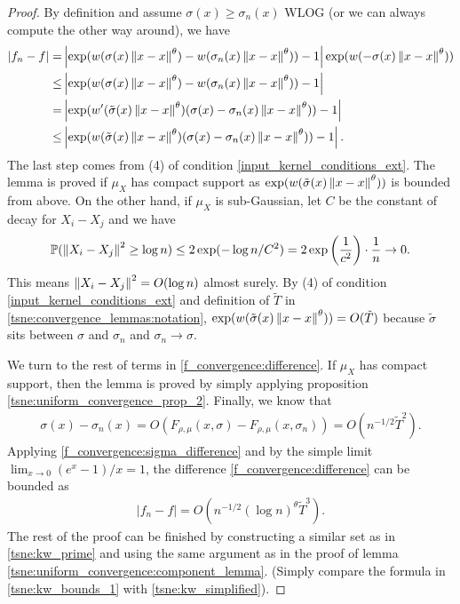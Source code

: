 \begin{proof}
    By definition and assume $\sigma(x) \geq \sigma_n(x)$ WLOG (or we can always compute the other way around), we have
    \begin{align} \label{f_convergence:difference}
        |f_n-f| = & \left|\exp(w(\sigma(x)\left\lVert x-x\right\rVert^{\theta})-w(\sigma_n(x)\left\lVert x-x\right\rVert^{\theta}))-1\right|\exp(w(-\sigma(x)\left\lVert x-x\right\rVert^{\theta})) \nonumber \\
        \leq      & \left|\exp(w(\sigma(x)\left\lVert x-x\right\rVert^{\theta})-w(\sigma_n(x)\left\lVert x-x\right\rVert^{\theta}))-1\right| \nonumber                                       \\
        =         & \left|\exp(w'(\tilde{\sigma}(x)\left\lVert x-x\right\rVert^{\theta})(\sigma(x)-\sigma_n(x)\left\lVert x-x\right\rVert^{\theta}))-1\right| \nonumber                      \\
        \leq      & \left|\exp(w(\tilde{\sigma}(x)\left\lVert x-x\right\rVert^{\theta})(\sigma(x)-\sigma_n(x)\left\lVert x-x\right\rVert^{\theta}))-1\right|.
    \end{align}
    The last step comes from (4) of condition \ref{input_kernel_conditions_ext}. The lemma is proved if $\mu_X$ has compact support as $\exp(w(\tilde{\sigma}(x)\left\lVert x-x\right\rVert^{\theta}))$ is bounded from above. On the other hand, if $\mu_X$ is sub-Gaussian, let $C$ be the constant of decay for $X_i-X_j$ and we have
    \begin{align} \label{tsne:distance_esti}
        \mathbb{P}(\left\lVert X_i-X_j\right\rVert^2 \geq \log n) \leq 2 \exp(-\log n /C^2) = 2 \exp\left(\frac{1}{c^2}\right) \cdot \frac{1}{n} \to 0.
    \end{align}
    This means $\left\lVert X_i-X_j\right\rVert^2 = O(\log n)$ almost surely. By (4) of condition \ref{input_kernel_conditions_ext} and definition of $\tilde{T}$ in \eqref{tsne:convergence_lemmas:notation}, $\exp(w(\tilde{\sigma}(x)\left\lVert x-x\right\rVert^{\theta})) = O(\tilde{T})$ because $\tilde{\sigma}$ sits between $\sigma$ and $\sigma_n$ and $\sigma_n \to \sigma$.

    We turn to the rest of terms in \eqref{f_convergence:difference}. If $\mu_X$
    has compact support, then the lemma is proved by simply applying proposition
    \ref{tsne:uniform_convergence_prop_2}. Finally, we know that
    \begin{align} \label{f_convergence:sigma_difference}
        \sigma(x)-\sigma_n(x) = O(F_{\rho,\mu}(x,\sigma)-F_{\rho,\mu}(x,\sigma_n)) = O(n^{-1/2}\tilde{T}^2).
    \end{align}
    Applying \eqref{f_convergence:sigma_difference} and by the simple limit $\lim_{x \to 0}(e^x-1)/x = 1$, the difference \eqref{f_convergence:difference} can be bounded as
    \begin{align} \label{tsne:kw_bounds_1}
        |f_n-f| = O(n^{-1/2} (\log n)^{\theta}\tilde{T}^3).
    \end{align}
    The rest of the proof can be finished by constructing a similar set as in \eqref{tsne:kw_prime} and using the same argument as in the proof of lemma \ref{tsne:uniform_convergence:component_lemma}. (Simply compare the formula in \eqref{tsne:kw_bounds_1} with \eqref{tsne:kw_simplified}).
\end{proof}
